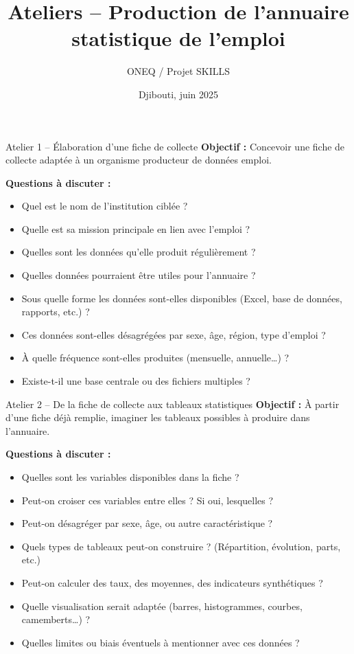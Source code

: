 \documentclass{beamer}
\title[Ateliers sur la production de l'annuaire]{Ateliers -- Production de l'annuaire statistique de l'emploi}
\author{ONEQ / Projet SKILLS}
\date{Djibouti, juin 2025}
\begin{document}
\begin{frame}
  \titlepage
\end{frame}

\begin{frame}{Atelier 1 – Élaboration d’une fiche de collecte}
\large
\textbf{Objectif :} Concevoir une fiche de collecte adaptée à un organisme producteur de données emploi.

\pause
\textbf{Questions à discuter :}
\begin{itemize}
  \item Quel est le nom de l’institution ciblée ?
  \item Quelle est sa mission principale en lien avec l’emploi ?
  \item Quelles sont les données qu’elle produit régulièrement ?
  \item Quelles données pourraient être utiles pour l’annuaire ?
  \item Sous quelle forme les données sont-elles disponibles (Excel, base de données, rapports, etc.) ?
  \item Ces données sont-elles désagrégées par sexe, âge, région, type d’emploi ?
  \item À quelle fréquence sont-elles produites (mensuelle, annuelle…) ?
  \item Existe-t-il une base centrale ou des fichiers multiples ?
\end{itemize}
\end{frame}

\begin{frame}{Atelier 2 – De la fiche de collecte aux tableaux statistiques}
\large
\textbf{Objectif :} À partir d’une fiche déjà remplie, imaginer les tableaux possibles à produire dans l’annuaire.

\pause
\textbf{Questions à discuter :}
\begin{itemize}
  \item Quelles sont les variables disponibles dans la fiche ?
  \item Peut-on croiser ces variables entre elles ? Si oui, lesquelles ?
  \item Peut-on désagréger par sexe, âge, ou autre caractéristique ?
  \item Quels types de tableaux peut-on construire ? (Répartition, évolution, parts, etc.)
  \item Peut-on calculer des taux, des moyennes, des indicateurs synthétiques ?
  \item Quelle visualisation serait adaptée (barres, histogrammes, courbes, camemberts…) ?
  \item Quelles limites ou biais éventuels à mentionner avec ces données ?
\end{itemize}
\end{frame}
\end{document}
